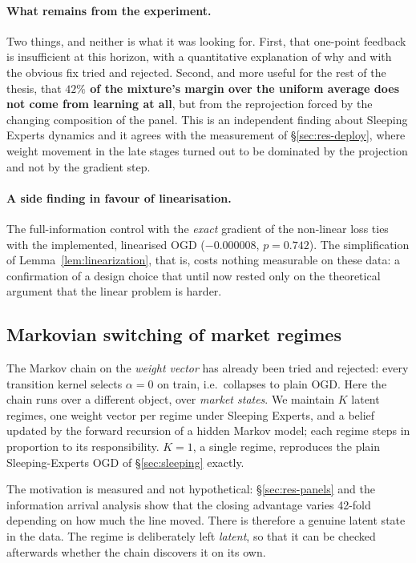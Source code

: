\documentclass[12pt,a4paper,oneside]{report}
\renewcommand{\_}{\oldunderscore\allowbreak}
\theoremstyle{definition}
\theoremstyle{plain}
\theoremstyle{definition}   %
\begin{document}
\paragraph{What remains from the experiment.} Two things, and neither is what it was looking for.
First, that one-point feedback is insufficient at this horizon, with a quantitative explanation of
why and with the obvious fix tried and rejected. Second, and more useful for the rest of the
thesis, that \textbf{$42\%$ of the mixture's margin over the uniform average does not come from
learning at all}, but from the reprojection forced by the changing composition of the panel. This
is an independent finding about Sleeping Experts dynamics and it agrees with the measurement of
\S\ref{sec:res-deploy}, where weight movement in the late stages turned out to be dominated by the
projection and not by the gradient step.

\paragraph{A side finding in favour of linearisation.} The full-information control with the
\emph{exact} gradient of the non-linear loss ties with the implemented, linearised OGD
($-0.000008$, $p=0.742$). The simplification of Lemma~\ref{lem:linearization}, that is, costs
nothing measurable on these data: a confirmation of a design choice that until now rested only
on the theoretical argument that the linear problem is harder.

\subsection{Markovian switching of market regimes}
\label{sec:res-regime}

The Markov chain on the \emph{weight vector} has already been tried and rejected: every
transition kernel selects $\alpha=0$ on train, i.e.\ collapses to plain OGD. Here the chain runs
over a different object, over \emph{market states}. We maintain $K$ latent regimes, one weight
vector per regime under Sleeping Experts, and a belief updated by the forward recursion of a
hidden Markov model; each regime steps in proportion to its responsibility. $K=1$, a single regime, reproduces
the plain Sleeping-Experts OGD of \S\ref{sec:sleeping} exactly.

The motivation is measured and not hypothetical: \S\ref{sec:res-panels} and the information
arrival analysis show that the closing advantage varies 42-fold depending on how much the line
moved. There is therefore a genuine latent state in the data. The regime is deliberately left
\emph{latent}, so that it can be checked afterwards whether the chain discovers it on its own.
\end{document}
